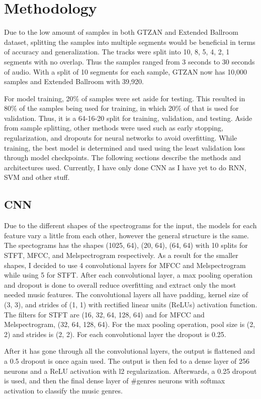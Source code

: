 \documentclass[10pt,twocolumn,letterpaper]{article}
\begin{document}
	\section{Methodology}
	
	Due to the low amount of samples in both GTZAN and Extended Ballroom dataset, splitting the samples into multiple segments would be beneficial in terms of accuracy and generalization. The tracks were split into 10, 8, 5, 4, 2, 1 segments with no overlap. Thus the samples ranged from 3 seconds to 30 seconds of audio. With a split of 10 segments for each sample, GTZAN now has 10,000 samples and Extended Ballroom with 39,920. 
	
	For model training, 20\% of samples were set aside for testing. This resulted in 80\% of the samples being used for training, in which 20\% of that is used for validation. Thus, it is a 64-16-20 split for training, validation, and testing. Aside from sample splitting, other methods were used such as early stopping, regularization, and dropouts for neural networks to avoid overfitting. While training, the best model is determined and used using the least validation loss through model checkpoints. The following sections describe the methods and architectures used. Currently, I have only done CNN as I have yet to do RNN, SVM and other stuff.
	
	\subsection{CNN}
	
	Due to the different shapes of the spectrograms for the input, the models for each feature vary a little from each other, however the general structure is the same. The spectograms has the shapes (1025, 64), (20, 64), (64, 64) with 10 splits for STFT, MFCC, and Melspectrogram respectively. As a result for the smaller shapes, I decided to use 4 convolutional layers for MFCC and Melspectrogram while using 5 for STFT. After each convolutional layer, a max pooling operation and dropout is done to overall reduce overfitting and extract only the most needed music features. The convolutional layers all have padding, kernel size of (3, 3), and strides of (1, 1) with rectified linear units (ReLUs) activation function. The filters for STFT are (16, 32, 64, 128, 64) and for MFCC and Melspectrogram, (32, 64, 128, 64). For the max pooling operation, pool size is (2, 2) and strides is (2, 2). For each convolutional layer the dropout is 0.25.
	
	After it has gone through all the convolutional layers, the output is flattened and a 0.5 dropout is once again used. The output is then fed to a dense layer of 256 neurons and a ReLU activation with l2 regularization. Afterwards, a 0.25 dropout is used, and then the final dense layer of \#genres neurons with softmax activation to classify the music genres.
	
\end{document}
